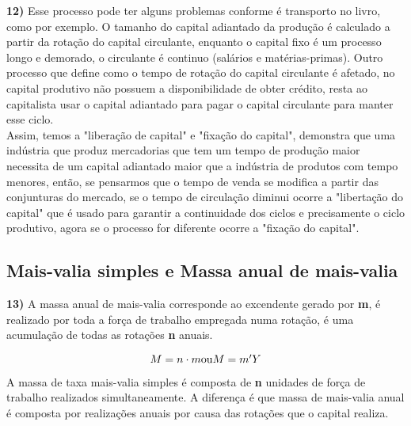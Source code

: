 \documentclass[a4paper, 12pt]{article} %
\begin{document}
\par \textbf{12)} Esse processo pode ter alguns problemas conforme é transporto no livro, como por exemplo. O tamanho do capital adiantado da produção é calculado a partir da rotação do capital circulante, enquanto o capital fixo é um processo longo e demorado, o circulante é continuo (salários e matérias-primas). Outro processo que define como o tempo de rotação do capital circulante é afetado, no capital produtivo não possuem a disponibilidade de obter crédito, resta ao capitalista usar o capital adiantado para pagar o capital circulante para manter esse ciclo.
\\
Assim, temos a "liberação de capital" e "fixação do capital", demonstra que uma indústria que produz mercadorias que tem um tempo de produção maior necessita de um capital adiantado maior que a indústria de produtos com tempo menores, então, se pensarmos que o tempo de venda se modifica a partir das conjunturas do mercado, se o tempo de circulação diminui ocorre a "libertação do capital" que é usado para garantir a continuidade dos ciclos e precisamente o ciclo produtivo, agora se o processo for diferente ocorre a "fixação do capital".

\vspace{0.5cm}

\begin{center}
\section{Mais-valia simples e Massa anual de mais-valia}	
\end{center}


\par \textbf{13)} A massa anual de mais-valia corresponde ao excendente gerado por \textbf{m}, é realizado por toda a força de trabalho empregada numa rotação, é uma acumulação de todas as rotações \textbf{n} anuais.

\begin{equation}
M = n \cdot m
$$\\$$
\text{ou}
$$\\$$
M = m'Y
\end{equation} 

A massa de taxa mais-valia simples é composta de \textbf{n} unidades de força de trabalho realizados simultaneamente. A diferença é que massa de mais-valia anual é composta por realizações anuais por causa das rotações que o capital realiza.

\vspace{0.5cm}
\end{document}
